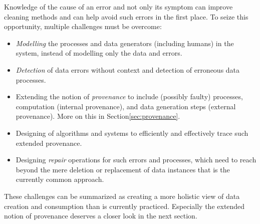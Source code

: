 Knowledge of the cause of an error and not only its symptom can improve cleaning methods and can help avoid such errors in the first place. To seize this opportunity, multiple challenges must be overcome:
\begin{itemize}
    \item \emph{Modelling} the processes and data generators (including humans) in the system, instead of modelling only the data and errors.

    \item \emph{Detection} of data errors without context and detection of erroneous data processes.
    
    \item Extending the notion of \emph{provenance} to include (possibly faulty) processes, computation (internal provenance), and data generation steps (external provenance). More on this in Section\ref{sec:provenance}.
    
    \item Designing of algorithms and systems to efficiently and effectively trace such extended provenance.
    
    \item Designing \emph{repair} operations for such errors and processes, which need to reach beyond the mere deletion or replacement of data instances that is the currently common approach.

\end{itemize}

These challenges can be summarized as creating a more holistic view of data creation and consumption than is currently practiced. Especially the extended notion of provenance deserves a closer look in the next section.





